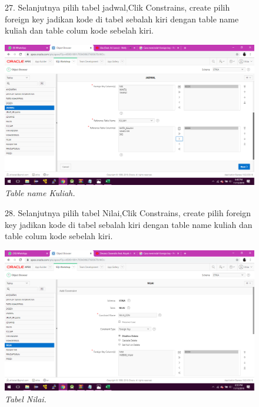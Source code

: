 \begin{enumerate}
\begin{figure}
\item[27.]Selanjutnya pilih tabel jadwal,Clik Constrains, create pilih foreign key jadikan kode di tabel sebalah kiri dengan table name kuliah dan table colum kode sebelah kiri.    
    \begin{center}
    \includegraphics[scale=0.3]{figures/49.png}
    \caption{\textit{Table name Kuliah.}}
    \end{center}
    \label{gambar}
    \end{figure}

\begin{figure}
\item[28.] Selanjutnya pilih tabel Nilai,Clik Constrains, create pilih foreign key jadikan kode di tabel sebalah kiri dengan table name kuliah dan table colum kode sebelah kiri.
    \begin{center}
    \includegraphics[scale=0.3]{figures/51.png}
    \caption{\textit{Tabel Nilai.}}
    \end{center}
    \label{gambar}
    \end{figure}


\end{enumerate}
